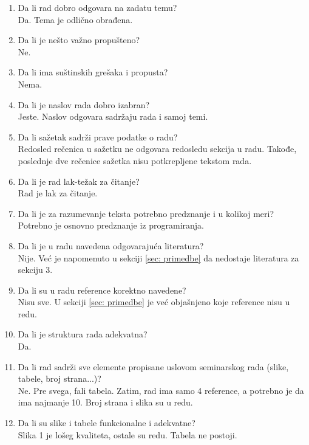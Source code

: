\documentclass[a4paper]{report}
\begin{document}
\begin{enumerate}
\item Da li rad dobro odgovara na zadatu temu?\\
	\noindent Da. Tema je odlično obrađena.

\item Da li je nešto važno propušteno?\\
	\noindent Ne.

\item Da li ima suštinskih grešaka i propusta?\\
	\noindent Nema.

\item Da li je naslov rada dobro izabran?\\
	\noindent Jeste. Naslov odgovara sadržaju rada i samoj temi.

\item Da li sažetak sadrži prave podatke o radu?\\
	\noindent Redosled rečenica u sažetku ne odgovara redosledu sekcija u radu. Takođe, poslednje dve rečenice sažetka nisu potkrepljene tekstom rada.

\item Da li je rad lak-težak za čitanje?\\
	\noindent Rad je lak za čitanje.

\item Da li je za razumevanje teksta potrebno predznanje i u kolikoj meri?\\
	\noindent Potrebno je osnovno predznanje iz programiranja.

\item Da li je u radu navedena odgovarajuća literatura?\\
	\noindent Nije. Već je napomenuto u sekciji \ref{sec: primedbe} da nedostaje literatura za sekciju 3.

\item Da li su u radu reference korektno navedene?\\
	\noindent Nisu sve. U sekciji \ref{sec: primedbe} je već objašnjeno koje reference nisu u redu.

\item Da li je struktura rada adekvatna?\\
	\noindent Da.

\item Da li rad sadrži sve elemente propisane uslovom seminarskog rada (slike, tabele, broj strana...)?\\
	\noindent Ne. Pre svega, fali tabela. Zatim, rad ima samo 4 reference, a potrebno je da ima najmanje 10. Broj strana i slika su u redu.

\item Da li su slike i tabele funkcionalne i adekvatne?\\
	\noindent Slika 1 je lošeg kvaliteta, ostale su redu. Tabela ne postoji. 

\end{enumerate}
\end{document}
